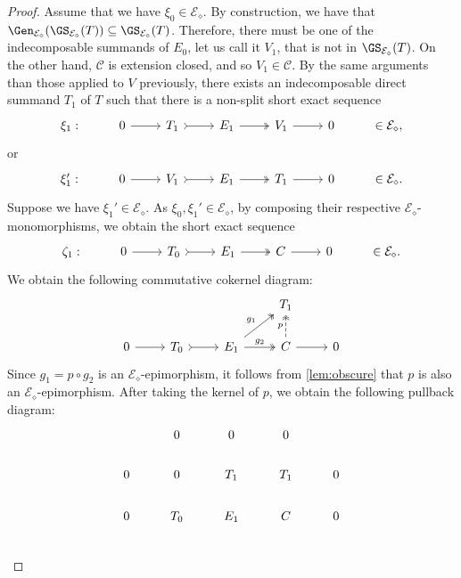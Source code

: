 \begin{proof}
Assume that we have $\xi_0 \in \mathcal{E}_\diamond$. By construction, we have that $\Gen_{\mathcal{E}_\diamond}(\GS_{\mathcal{E}_\diamond}(T)) \subseteq \GS_{\mathcal{E}_\diamond}(T)$. Therefore, there must be one of the indecomposable summands of $E_0$, let us call it $V_1$, that is not in $\GS_{\mathcal{E}_\diamond}(T)$. On the other hand, $\mathscr{C}$ is extension closed, and so $V_1 \in \mathscr{C}$. By the same arguments than those applied to $V$ previously, there exists an indecomposable direct summand $T_1$ of $T$ such that there is a non-split short exact sequence \[\begin{tikzcd}
	\xi_1: & 0 & T_1 & E_1 & V_1 &  0 & \in \mathcal{E}_\diamond,
	\arrow[from=1-2, to=1-3]
	\arrow[tail, from=1-3, to=1-4]
	\arrow[two heads,from=1-4, to=1-5]
	\arrow[from=1-5, to=1-6]
\end{tikzcd}\]  or \[\begin{tikzcd}
	\xi_1': & 0 & V_1 & E_1 & T_1 &  0 & \in \mathcal{E}_\diamond.
	\arrow[from=1-2, to=1-3]
	\arrow[tail, from=1-3, to=1-4]
	\arrow[two heads,from=1-4, to=1-5]
	\arrow[from=1-5, to=1-6]
\end{tikzcd}\] 
Suppose we have $\xi_1' \in \mathcal{E}_\diamond$. As $\xi_0,\xi_1' \in \mathcal{E}_\diamond$, by composing their respective $\mathcal{E}_\diamond$-monomorphisms, we obtain the short exact sequence \[\begin{tikzcd}
	\zeta_1: & 0 & T_0 & E_1 & C &  0 & \in \mathcal{E}_\diamond.
	\arrow[from=1-2, to=1-3]
	\arrow[tail, from=1-3, to=1-4]
	\arrow[two heads,from=1-4, to=1-5]
	\arrow[from=1-5, to=1-6]
\end{tikzcd}\] We obtain the following commutative cokernel diagram:
\[\begin{tikzcd}
         & & & T_1 & \\
	 0 & T_0 & E_1 & C &  0 
	\arrow[from=2-1, to=2-2]
	\arrow[tail, from=2-2, to=2-3]
	\arrow[two heads,"g_2",from=2-3, to=2-4]
        \arrow[two heads,"g_1",from=2-3, to=1-4]
        \arrow[two heads,dashed,"p",from=2-4, to=1-4]
	\arrow[from=2-4, to=2-5]
\end{tikzcd}\] 
Since $g_1 = p \circ g_2$ is an $ \mathcal{E}_\diamond$-epimorphism, it follows from \cref{lem:obscure} that $p$ is also an $\mathcal{E}_\diamond$-epimorphism. After taking the kernel of $p$, we obtain the following pullback diagram:
\[\begin{tikzcd}
         & 0 & 0 & 0 &  \\
	0 & 0 & T_1  & T_1 &  0 \\
     0 & T_0 & E_1 & C & 0 \\

\end{tikzcd}\]
\end{proof}

